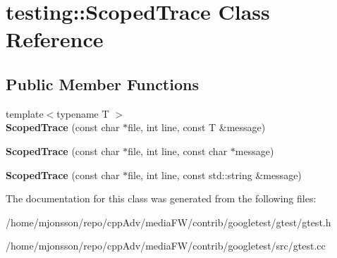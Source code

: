 \hypertarget{classtesting_1_1ScopedTrace}{}\section{testing\+:\+:Scoped\+Trace Class Reference}
\label{classtesting_1_1ScopedTrace}
\subsection*{Public Member Functions}
\begin{DoxyCompactItemize}
\item 
\mbox{\label{classtesting_1_1ScopedTrace_a2da90b95d682d518cca472934d53c59c}} 
{\footnotesize template$<$typename T $>$ }\\{\bfseries Scoped\+Trace} (const char $\ast$file, int line, const T \&message)
\item 
\mbox{\label{classtesting_1_1ScopedTrace_accd2a06cc941ffd7d6fe109adfdb4f19}} 
{\bfseries Scoped\+Trace} (const char $\ast$file, int line, const char $\ast$message)
\item 
\mbox{\label{classtesting_1_1ScopedTrace_a1f453a2aade0db6955a111a7cb329615}} 
{\bfseries Scoped\+Trace} (const char $\ast$file, int line, const std\+::string \&message)
\end{DoxyCompactItemize}


The documentation for this class was generated from the following files\+:\begin{DoxyCompactItemize}
\item 
/home/mjonsson/repo/cpp\+Adv/media\+F\+W/contrib/googletest/gtest/gtest.\+h\item 
/home/mjonsson/repo/cpp\+Adv/media\+F\+W/contrib/googletest/src/gtest.\+cc\end{DoxyCompactItemize}
